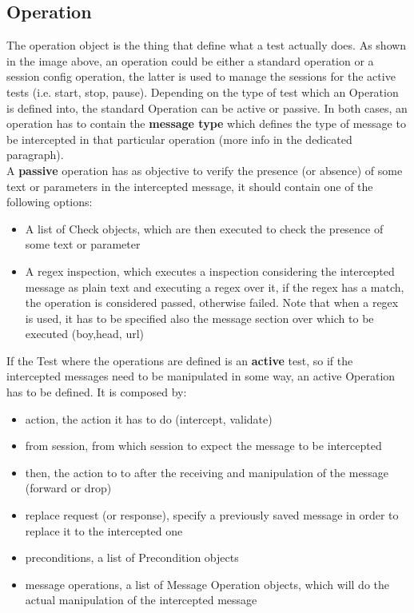 \subsection{Operation}
The operation object is the thing that define what a test actually does. As shown in the image above, an operation could be either a standard operation or a session config operation, the latter is used to manage the sessions for the active tests (i.e. start, stop, pause). Depending on the type of test which an Operation is defined into, the standard Operation can be active or passive.
In both cases, an operation has to contain the \textbf{message type} which defines the type of message to be intercepted in that particular operation (more info in the dedicated paragraph).
\\A \textbf{passive} operation has as objective to verify the presence (or absence) of some text or parameters in the intercepted message, it should contain one of the following options:
\begin{itemize}
    \item A list of Check objects, which are then executed to check the presence of some text or parameter
    \item A regex inspection, which executes a inspection considering the intercepted message as plain text and executing a regex over it, if the regex has a match, the operation is considered passed, otherwise failed. Note that when a regex is used, it has to be specified also the message section over which to be executed (boy,head, url)
\end{itemize}

If the Test where the operations are defined is an \textbf{active} test, so if the intercepted messages need to be manipulated in some way, an active Operation has to be defined. It is composed by:
\begin{itemize}
    \item action, the action it has to do (intercept, validate)
    \item from session, from which session to expect the message to be intercepted
    \item then, the action to to after the receiving and manipulation of the message (forward or drop)
    \item replace request (or response), specify a previously saved message in order to replace it to the intercepted one
    \item preconditions, a list of Precondition objects
    \item message operations, a list of Message Operation objects, which will do the actual manipulation of the intercepted message
\end{itemize}


